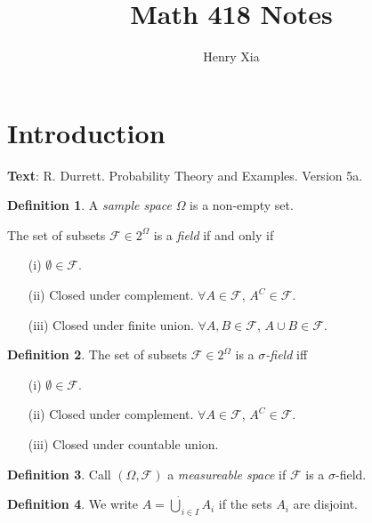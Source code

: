 \documentclass[11pt]{article}
\title{Math 418 Notes}
\author{Henry Xia}
\theoremstyle{definition}
\newtheorem{defn}{Definition}[section]
\begin{document}
\maketitle

\tableofcontents


\section{Introduction}

\textbf{Text}: R. Durrett. Probability Theory and Examples. Version 5a.

\begin{defn}
    A \emph{sample space} $\Omega$ is a non-empty set.

    The set of subsets $\mathcal{F} \in 2^\Omega$ is a \emph{field} if and only if
    \begin{enumerate}
        \item[(i)] $\emptyset\in\mathcal{F}$.
        \item[(ii)] Closed under complement. $\forall A \in \mathcal{F}$, $A^C \in \mathcal{F}$.
        \item[(iii)] Closed under finite union. $\forall A,B \in \mathcal{F}$, $A\cup B \in \mathcal{F}$.
    \end{enumerate}
\end{defn}

\begin{defn}
    The set of subsets $\mathcal{F} \in 2^\Omega$ is a \emph{$\sigma$-field} iff 
    \begin{enumerate}
        \item[(i)] $\emptyset\in\mathcal{F}$.
        \item[(ii)] Closed under complement. $\forall A \in \mathcal{F}$, $A^C \in \mathcal{F}$.
        \item[(iii)] Closed under countable union.
    \end{enumerate}
\end{defn}

\begin{defn}
    Call $(\Omega, \mathcal{F})$ a \emph{measureable space} if $\mathcal{F}$ is a $\sigma$-field.
\end{defn}

\begin{defn}
    We write $A = \dot\bigcup_{i\in{I}} A_i$ if the sets $A_i$ are disjoint.
\end{defn}
\end{document}
